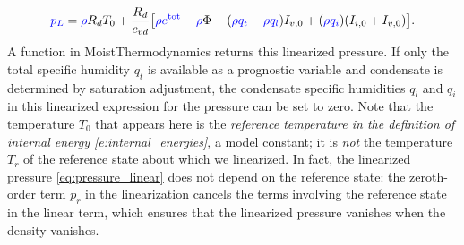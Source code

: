 \documentclass{report}
\begin{document}
\begin{equation}\label{eq:pressure_linear}
\textcolor{blue}{p_L} = \textcolor{blue}{\rho} R_d T_0 + \frac{R_d}{c_{vd}} \bigl[ \textcolor{blue}{\rho e^{\mathrm{tot}}} - \textcolor{blue}{\rho} \Phi - (\textcolor{blue}{\rho q_t} - \textcolor{blue}{\rho q_l})I_{v,0} + (\textcolor{blue}{\rho q_i}) (I_{i,0} + I_{v,0}) \bigr].
\end{equation}
A function in MoistThermodynamics returns this linearized pressure. If only the total specific humidity $q_t$ is available as a prognostic variable and condensate is determined by saturation adjustment, the condensate specific humidities $q_l$ and $q_i$ in this linearized expression for the pressure can be set to zero. Note that the temperature $T_0$ that appears here is the \emph{reference temperature in the definition of internal energy \eqref{e:internal_energies}}, a model constant; it is \emph{not} the temperature $T_r$ of the reference state about which we linearized. In fact, the linearized pressure \eqref{eq:pressure_linear} does not depend on the reference state: the zeroth-order term $p_r$ in the linearization cancels the terms involving the reference state in the linear term, which ensures that the linearized pressure vanishes when the density vanishes. 
\end{document}
